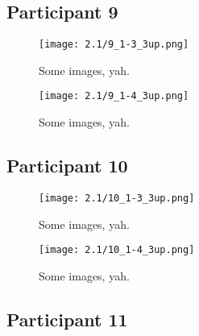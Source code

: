 
\clearpage

\subsection{Participant 9}

\begin{figure}[h]
	\begin{center}
	\texttt{[image: 2.1/9\_1-3\_3up.png]}
	\caption{Some images, yah.}
	\end{center}
\end{figure}

\clearpage

\begin{figure}[h]
	\begin{center}
	\texttt{[image: 2.1/9\_1-4\_3up.png]}
	\caption{Some images, yah.}
	\end{center}
\end{figure}


\clearpage

\subsection{Participant 10}

\begin{figure}[h]
	\begin{center}
	\texttt{[image: 2.1/10\_1-3\_3up.png]}
	\caption{Some images, yah.}
	\end{center}
\end{figure}

\clearpage

\begin{figure}[h]
	\begin{center}
	\texttt{[image: 2.1/10\_1-4\_3up.png]}
	\caption{Some images, yah.}
	\end{center}
\end{figure}


\clearpage

\subsection{Participant 11}

